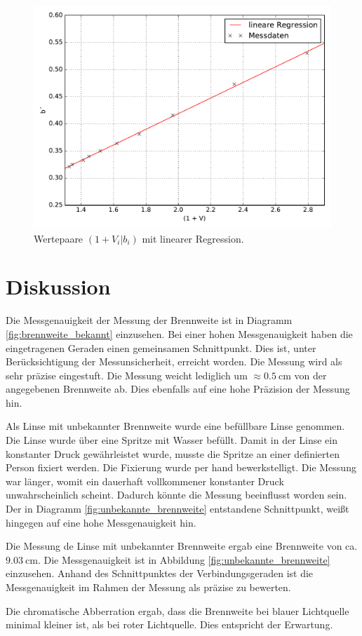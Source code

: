 \begin{figure}
  \centering
  \includegraphics[width=\textwidth]{Messung_abbe_b.pdf}
  \caption{Wertepaare $(1 + V_i|b_i)$ mit linearer Regression.}
  \label{fig:abbe_b}
\end{figure}



\section{Diskussion}

Die Messgenauigkeit der Messung der Brennweite ist in Diagramm
\ref{fig:brennweite_bekannt} einzusehen. Bei einer hohen Messgenauigkeit haben
die eingetragenen Geraden einen gemeinsamen Schnittpunkt. Dies ist, unter
Berücksichtigung der Messunsicherheit, erreicht worden. Die Messung wird als
sehr präzise eingestuft. Die Messung weicht lediglich um
$\approx\SI{0,5}{\centi\meter}$ von der angegebenen Brennweite ab. Dies ebenfalls
auf eine hohe Präzision der Messung hin.

Als Linse mit unbekannter Brennweite wurde eine befüllbare Linse genommen. Die
Linse wurde über eine Spritze mit Wasser befüllt. Damit in der Linse ein konstanter
Druck gewährleistet wurde, musste die Spritze an einer definierten Person fixiert
werden. Die Fixierung wurde per hand bewerkstelligt. Die Messung war länger, womit
ein dauerhaft vollkommener konstanter Druck unwahrscheinlich scheint. Dadurch könnte
die Messung beeinflusst worden sein. Der in Diagramm
\ref{fig:unbekannte_brennweite} entstandene Schnittpunkt, weißt hingegen auf eine
hohe Messgenauigkeit hin.

Die Messung de Linse mit unbekannter Brennweite ergab eine Brennweite von ca. $\SI{9,03}{\centi\meter}$.
Die Messgenauigkeit ist in Abbildung \ref{fig:unbekannte_brennweite} einzusehen.
Anhand des Schnittpunktes der Verbindungsgeraden ist die Messgenauigkeit im Rahmen
der Messung als präzise zu bewerten.  

Die chromatische Abberration ergab, dass die Brennweite bei blauer Lichtquelle
minimal kleiner ist, als bei roter Lichtquelle. Dies entspricht der Erwartung.


